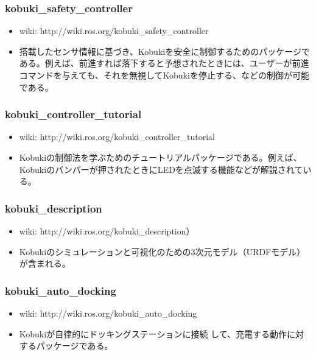 \begin{itemize}
\subsubsection{kobuki\_safety\_controller}

\begin{itemize}
\item wiki: http://wiki.ros.org/kobuki\_safety\_controller
\item 搭載したセンサ情報に基づき、Kobukiを安全に制御するためのパッケージである。例えば、前進すれば落下すると予想されたときには、ユーザーが前進コマンドを与えても、それを無視してKobukiを停止する、などの制御が可能である。
\end{itemize}

\subsubsection{kobuki\_controller\_tutorial}

\begin{itemize}
\item wiki:  http://wiki.ros.org/kobuki\_controller\_tutorial
\item Kobukiの制御法を学ぶためのチュートリアルパッケージである。例えば、Kobukiのバンパーが押されたときにLEDを点滅する機能などが解説されている。
\end{itemize}

\subsubsection{kobuki\_description}

\begin{itemize}
\item wiki: http://wiki.ros.org/kobuki\_description）
\item Kobukiのシミュレーションと可視化のための3次元モデル（URDFモデル）が含まれる。
\end{itemize}

\subsubsection{kobuki\_auto\_docking}

\begin{itemize}
\item wiki: http://wiki.ros.org/kobuki\_auto\_docking
\item Kobukiが自律的にドッキングステーションに接続  して、充電する動作に対するパッケージである。
\end{itemize}


\end{itemize}
